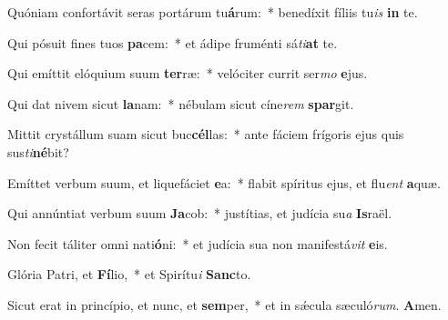 \setcounter{versecount}{2}

\vs Quóniam confortávit seras portárum tu\textbf{á}rum:~* benedíxit fíliis tu\textit{is} \textbf{in} te.

\vs Qui pósuit fines tuos \textbf{pa}cem:~* et ádipe fruménti sá\textit{ti}\textbf{at} te.

\vs Qui emíttit elóquium suum \textbf{ter}ræ:~* velóciter currit ser\textit{mo} \textbf{e}jus.

\vs Qui dat nivem sicut \textbf{la}nam:~* nébulam sicut cíne\textit{rem} \textbf{spar}git.

\vs Mittit crystállum suam sicut buc\textbf{cél}las:~* ante fáciem frígoris ejus quis sus\textit{ti}\textbf{né}bit?

\vs Emíttet verbum suum, et liquefáciet \textbf{e}a:~* flabit spíritus ejus, et flu\textit{ent} \textbf{a}quæ.

\vs Qui annúntiat verbum suum \textbf{Ja}cob:~* justítias, et judícia su\textit{a} \textbf{Is}raël.

\vs Non fecit táliter omni nati\textbf{ó}ni:~* et judícia sua non manifestá\textit{vit} \textbf{e}is.

\vs Glória Patri, et \textbf{Fí}lio,~* et Spirítu\textit{i} \textbf{Sanc}to.

\vs Sicut erat in princípio, et nunc, et \textbf{sem}per,~* et in sǽcula sæculó\textit{rum}. \textbf{A}men.


